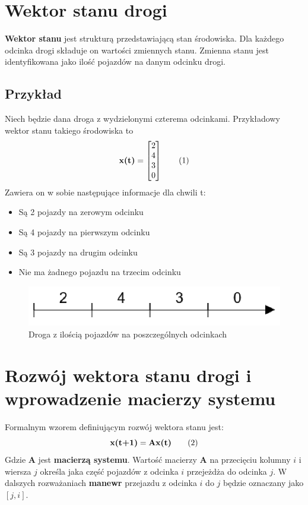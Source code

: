 \documentclass[12pt]{book}
\theoremstyle{plain}
\newcommand\addtag{\refstepcounter{equation}
\renewcommand{\labelenumii}{\theenumii}
\renewcommand{\theenumii}{\theenumi.\arabic{enumii}.}
\tag{\theequation}}
\newcommand{\myref}[1]{(\ref{#1})}
\begin{document}
\section{Wektor stanu drogi} \label{sec:wektor_stanu_drogi}
\textbf{Wektor stanu} jest strukturą przedstawiającą stan środowiska. Dla każdego odcinka drogi składuje on wartości zmiennych stanu. Zmienna stanu jest identyfikowana jako ilość pojazdów na danym odcinku drogi. 
\subsection*{Przykład} \label{subsec:example-single-road}
Niech będzie dana droga z wydzielonymi czterema odcinkami. Przykładowy wektor stanu takiego środowiska to
\[\textbf{x(t)}=\begin{bmatrix}
2 \\ 4 \\ 3 \\ 0
\end{bmatrix} \addtag \]
Zawiera on w sobie następujące informacje dla chwili t:
\begin{itemize}
	\item Są 2 pojazdy na zerowym odcinku
	\item Są 4 pojazdy na pierwszym odcinku
	\item Są 3 pojazdy na drugim odcinku
	\item Nie ma żadnego pojazdu na trzecim odcinku
\end{itemize}

\begin{figure}[H]
	\centering
	\includegraphics[width=14cm]{images/1_droga_4_odcinki}
	\caption{Droga z ilością pojazdów na poszczególnych odcinkach}
	\label{fig:single_road}
\end{figure}
\section{Rozwój wektora stanu drogi i wprowadzenie macierzy systemu} \label{sec:macierz_systemu_def}
Formalnym wzorem definiującym rozwój wektora stanu jest:
\[\textbf{x(t+1)}=\textbf{Ax(t)} \addtag \label{eq:single_road} \]
Gdzie $\textbf{A}$ jest \textbf{macierzą systemu}. Wartość macierzy $\textbf{A}$ na przecięciu kolumny $i$ i wiersza $j$  określa jaka część pojazdów z odcinka $i$ przejeżdża do odcinka $j$. W dalszych rozważaniach \textbf{manewr} przejazdu z odcinka $i$ do $j$ będzie oznaczany jako $[j,i]$.
\end{document}
